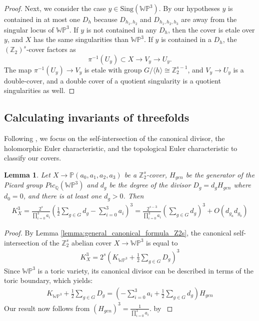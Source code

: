 \documentclass[12pt,twoside,]{amsart}
\theoremstyle{plain}
\newtheorem{lemma}[theorem]{Lemma}
\theoremstyle{definition}
\begin{document}
\begin{proof}
Next, we consider the case $y \in  \text{Sing}(\mathbb{WP}^3)$. By our hypotheses $y$ is contained in at most one $D_h$ because $D_{h_1,h_2}$ and $D_{h_1,h_2,h_3}$ are away from the singular locus of $\mathbb{WP}^3$.   If $y$ is not contained in any $D_h$, then the cover is etale over $y$, and $X$ has the same singularities than $\mathbb{WP}^3$. If $y$ is contained in a $D_h$, the $(\mathbb{Z}_2)^s$-cover factors as 
\[
\pi^{-1}({U_y}) \subset X \rightarrow V_y \rightarrow U_y.
\]
The map $\pi^{-1}(U_y) \rightarrow V_y $ is etale with group  $G / \langle h \rangle \cong \mathbb{Z}_2^{s-1}$, and $V_y \rightarrow U_y$ is a double-cover, and a double cover of a quotient singularity
is a quotient singularities as well. 
\end{proof}

\subsection{Calculating invariants of threefolds}\label{sec:calculation_invariants}

Following \cite[Sec 6-10]{huntthreefolds89},  we focus on the self-intersection of the canonical divisor, the holomorphic Euler characteristic, and the topological Euler characteristic to classify our covers.

\begin{lemma}\label{lemma:K3}
Let $X \rightarrow \mathbb{P}(a_0,a_1,a_2,a_3)$ be a $\mathbb{Z}_2^s$-cover, $H_{gen}$ be the generator of the Picard group $Pic_{\mathbb{Q}}(\mathbb{WP}^3)$ and $d_g$ be the degree of the divisor $D_g = d_g H_{gen}$ where $d_0 =0$,
and there is at least one $d_g > 0$.
Then
\begin{align*}
    K_X^3  = 
  \frac{2^s}{\prod_{i=0}^3 a_i}   
  \left(
   \frac{1}{2}\sum_{g \in G} d_{g}
  - \sum_{i=0}^3 a_{i} 
  \right)^3
= 
 \frac{2^{s-3}}{\prod_{i=0}^3 a_i}  
 \left( \sum_{g \in G} d_g \right)^3   
 + O\left( d_{g_a}d_{g_b} \right) 
\end{align*}
\end{lemma}
\begin{proof}
By Lemma \ref{lemma:general_canonical_formula_Z2s}, the canonical self-intersection of the $\mathbb{Z}_2^s$ abelian cover
$X \rightarrow \mathbb{WP}^3$ is equal to 
\begin{align*}
  K_X^3 =  2^{s}\left( 
  K_{\mathbb{WP}^3} + \frac{1}{2}\sum_{g \in G} D_{g}
  \right)^3
\end{align*}
Since $\mathbb{WP}^3$ is a toric variety, its canonical divisor can be described in terms of the toric boundary, which yields:
\begin{align*}
  K_{\mathbb{WP}^3} + \frac{1}{2}\sum_{g \in G} D_{g}
  =
  \left(
  - \sum_{i=0}^3 a_{i} + \frac{1}{2}\sum_{g \in G} d_{g}
  \right)H_{gen}
\end{align*}
Our result now follows from 
\(
(H_{gen})^3 = \frac{1}{\prod_{i=0}^3 a_i}.
\)
by \cite[lemma 12.5.2]{cox2024toric}
\end{proof}
\end{document}
